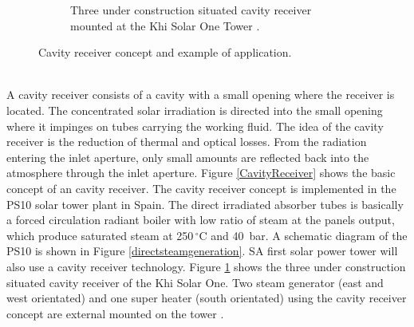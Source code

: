 \documentclass[Master,MEE,english]{twbook}%
\begin{document}
\begin{figure}[!htbp]
\begin{subfigure}[b]{0.5\textwidth}
                \caption{Three under construction situated cavity receiver mounted at the  Khi Solar One Tower \cite{CMI_Energy2015}.}\label{KhiSolarOneReceiver}
        \end{subfigure}
        \caption[Cacity receiver concept and example of application.]{Cavity receiver concept and example of application.}\label{CavityReceiverConceptKhiSolar}
\end{figure}
\\
A cavity receiver consists of a cavity with a small opening where the receiver is located. The concentrated solar irradiation is directed into the small opening where it impinges on tubes carrying the working fluid. The idea of the cavity receiver is the reduction of thermal and optical losses. From the radiation entering the inlet aperture, only small amounts are reflected back into the atmosphere through the inlet aperture. Figure \ref{CavityReceiver} shows the basic concept of an cavity receiver. The cavity receiver concept is implemented in the PS10 solar tower plant in Spain. The direct irradiated absorber tubes is basically a forced circulation radiant boiler with low ratio of steam at the panels output, which produce saturated steam at 250$\,^{\circ}\mathrm{C}$ and 40~bar. A schematic diagram of the PS10 is shown in Figure \ref{directsteamgeneration}. SA first solar power tower will also use a cavity receiver technology. Figure \ref{KhiSolarOneReceiver} shows the three under construction situated cavity receiver of the Khi Solar One. Two steam generator (east and west orientated) and one super heater (south orientated) using the cavity receiver concept are external mounted on the tower \cite{Prof.Dinter2015}.
\end{document}
